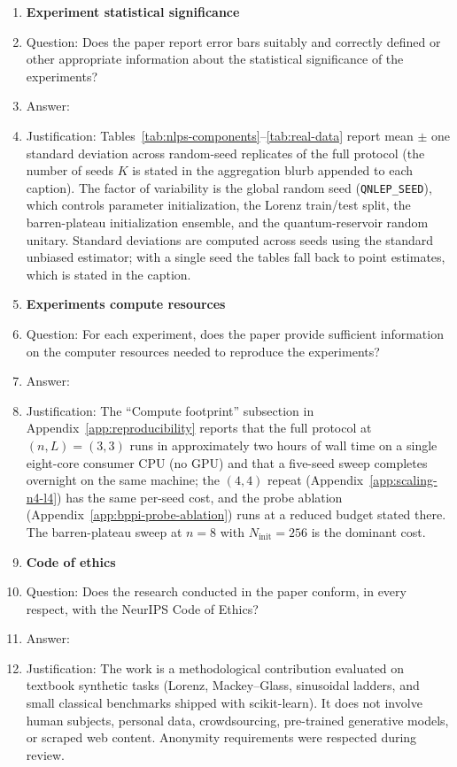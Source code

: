 \begin{enumerate}
\item {\bf Experiment statistical significance}
    \item[] Question: Does the paper report error bars suitably and correctly defined or other appropriate information about the statistical significance of the experiments?
    \item[] Answer: \answerYes{}
    \item[] Justification: Tables~\ref{tab:nlps-components}--\ref{tab:real-data} report mean $\pm$ one standard deviation across random-seed replicates of the full protocol (the number of seeds $K$ is stated in the aggregation blurb appended to each caption). The factor of variability is the global random seed (\texttt{QNLEP\_SEED}), which controls parameter initialization, the Lorenz train/test split, the barren-plateau initialization ensemble, and the quantum-reservoir random unitary. Standard deviations are computed across seeds using the standard unbiased estimator; with a single seed the tables fall back to point estimates, which is stated in the caption.

\item {\bf Experiments compute resources}
    \item[] Question: For each experiment, does the paper provide sufficient information on the computer resources needed to reproduce the experiments?
    \item[] Answer: \answerYes{}
    \item[] Justification: The ``Compute footprint'' subsection in Appendix~\ref{app:reproducibility} reports that the full protocol at $(n, L) = (3, 3)$ runs in approximately two hours of wall time on a single eight-core consumer CPU (no GPU) and that a five-seed sweep completes overnight on the same machine; the $(4,4)$ repeat (Appendix~\ref{app:scaling-n4-l4}) has the same per-seed cost, and the probe ablation (Appendix~\ref{app:bppi-probe-ablation}) runs at a reduced budget stated there. The barren-plateau sweep at $n = 8$ with $N_{\mathrm{init}} = 256$ is the dominant cost.

\item {\bf Code of ethics}
    \item[] Question: Does the research conducted in the paper conform, in every respect, with the NeurIPS Code of Ethics?
    \item[] Answer: \answerYes{}
    \item[] Justification: The work is a methodological contribution evaluated on textbook synthetic tasks (Lorenz, Mackey--Glass, sinusoidal ladders, and small classical benchmarks shipped with scikit-learn). It does not involve human subjects, personal data, crowdsourcing, pre-trained generative models, or scraped web content. Anonymity requirements were respected during review.


\end{enumerate}
